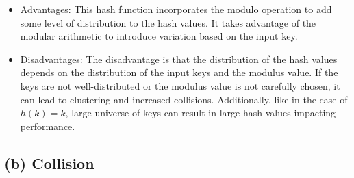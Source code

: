 \documentclass[10pt]{article}
\begin{document}
\begin{itemize}
{        \begin{itemize}
          \item {
                Advantages: This hash function incorporates the modulo operation to add some level of distribution to the hash values. It takes advantage of the modular arithmetic to introduce variation based on the input key.
                }
          \item {
                Disadvantages: The disadvantage is that the distribution of the hash values depends on the distribution of the input keys and the modulus value. If the keys are not well-distributed or the modulus value is not carefully chosen, it can lead to clustering and increased collisions. Additionally, like in the case of $h(k) = k$, large universe of keys can result in large hash values impacting performance.
                }
        \end{itemize}
        }
\end{itemize}

\subsection*{(b) Collision}
\end{document}
